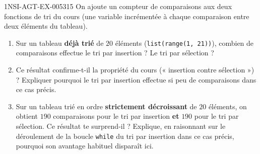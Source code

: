 \begin{exercice}{1NSI-AGT-EX-005}{3}{15}
On ajoute un compteur de comparaisons aux deux fonctions de tri du cours (une variable
incrémentée à chaque comparaison entre deux éléments du tableau).
\begin{enumerate}
  \item Sur un tableau \textbf{déjà trié} de $20$ éléments (\lstinline{list(range(1, 21))}), combien de comparaisons effectue le tri par insertion ? Le tri par sélection ?
  \item Ce résultat confirme-t-il la propriété du cours (« insertion contre sélection ») ? Expliquer pourquoi le tri par insertion effectue si peu de comparaisons dans ce cas précis.
  \item Sur un tableau trié en ordre \textbf{strictement décroissant} de $20$ éléments, on obtient $190$ comparaisons pour le tri par insertion \textbf{et} $190$ pour le tri par sélection. Ce résultat te surprend-il ? Explique, en raisonnant sur le déroulement de la boucle \lstinline{while} du tri par insertion dans ce cas précis, pourquoi son avantage habituel disparaît ici.
\end{enumerate}
\end{exercice}
